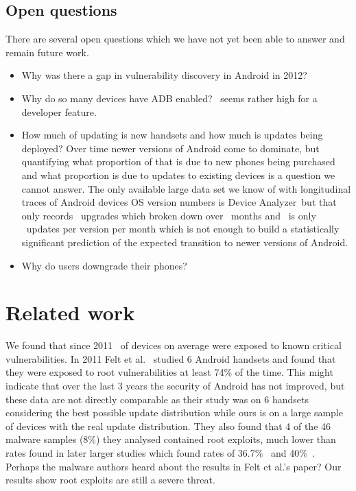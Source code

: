 \documentclass[conference,a4paper,twoside]{IEEEtran}
\newcommand{\da}{Device Analyzer}
\begin{document}
\subsection{Open questions}
There are several open questions which we have not yet been able to answer and remain future work.
\begin{itemize}
 \item Why was there a gap in vulnerability discovery in Android in 2012?
 \item Why do so many devices have ADB enabled? \daAdbEnabledPerc\ seems rather high for a developer feature.
 \item How much of updating is new handsets and how much is updates being deployed? Over time newer versions of Android come to dominate, but quantifying what proportion of that is due to new phones being purchased and what proportion is due to updates to existing devices is a question we cannot answer.
 The only available large data set we know of with longitudinal traces of Android devices OS version numbers is \da\ but that only records \daNumUpdatesUpgrades\ upgrades which broken down over \daOSMonthsOfData\ months and \daNumSigOSVersions\ is only \daUpdatesPerMonthPerVersion\ updates per version per month which is not enough to build a statistically significant prediction of the expected transition to newer versions of Android.
 \item Why do users downgrade their phones?
\end{itemize}


\section{Related work}
\label{sec:related}
We found that since 2011 \daMeanInsecurityPerc\ of devices on average were exposed to known critical vulnerabilities.
In 2011 Felt et al.\ \cite{Felt2011} studied 6 Android handsets and found that they were exposed to root vulnerabilities at least 74\% of the time.
This might indicate that over the last 3 years the security of Android has not improved, but these data are not directly comparable as their study was on 6 handsets considering the best possible update distribution while ours is on a large sample of devices with the real update distribution.
They also found that 4 of the 46 malware samples (8\%) they analysed contained root exploits, much lower than rates found in later larger studies which found rates of 36.7\%~\cite{Zhou2012b} and 40\%~\cite{Zhou2012a}.
Perhaps the malware authors heard about the results in Felt et al.'s paper?
Our results show root exploits are still a severe threat.
\end{document}
